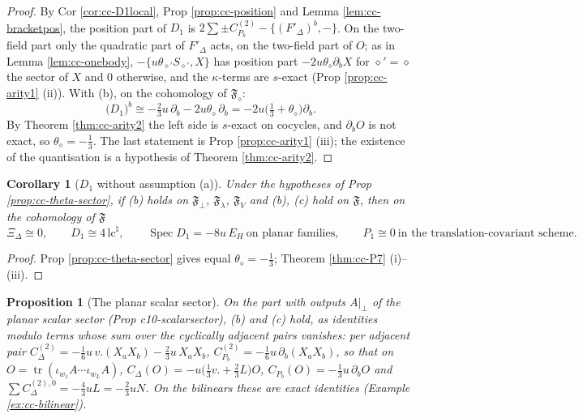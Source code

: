 \documentclass[11pt]{article}
\numberwithin{equation}{section}
\theoremstyle{plain}
\newtheorem{proposition}[theorem]{Proposition}
\newtheorem{corollary}[theorem]{Corollary}
\theoremstyle{definition}
\newcommand{\Ap}{A|_{\perp}}
\begin{document}
\begin{proof}
By Cor \ref{cor:cc-D1local}, Prop \ref{prop:cc-position} and Lemma \ref{lem:cc-bracketpos}, the position part of $D_1$ is $2\sum\pm C^{(2)}_{P_b}-\{(F'_\Delta)^b,-\}$. On the two-field part only the quadratic part of $F'_\Delta$ acts, on the two-field part of $O$; as in Lemma \ref{lem:cc-onebody}, $-\{u\theta_{\diamond'}S_{\diamond'},X\}$ has position part $-2u\theta_\diamond\partial_bX$ for $\diamond'=\diamond$ the sector of $X$ and $0$ otherwise, and the $\kappa$-terms are $s$-exact (Prop \ref{prop:cc-arity1} (ii)). With (b), on the cohomology of $\mathfrak F_\diamond$:
\[
\big(D_1\big)^b\cong-\tfrac23u\,\partial_b-2u\theta_\diamond\,\partial_b=-2u\big(\tfrac13+\theta_\diamond\big)\partial_b .
\]
By Theorem \ref{thm:cc-arity2} the left side is $s$-exact on cocycles, and $\partial_bO$ is not exact, so $\theta_\diamond=-\tfrac13$. The last statement is Prop \ref{prop:cc-arity1} (iii); the existence of the quantisation is a hypothesis of Theorem \ref{thm:cc-arity2}.
\end{proof}

\begin{corollary}[$D_1$ without assumption (a)]
\label{cor:cc-noA}
Under the hypotheses of Prop \ref{prop:cc-theta-sector}, if (b) holds on $\mathfrak F_\perp$, $\mathfrak F_\lambda$, $\mathfrak F_V$ and (b), (c) hold on $\mathfrak F$, then on the cohomology of $\mathfrak F$
\[
\Xi_\Delta\cong0,\qquad D_1\cong4\,\mathrm{lc}^\natural,\qquad \operatorname{Spec}D_1=-8u\,E_H\ \text{on planar families},\qquad P_1\cong0\ \text{in the translation-covariant scheme}.
\]
\end{corollary}

\begin{proof}
Prop \ref{prop:cc-theta-sector} gives equal $\theta_\diamond=-\tfrac13$; Theorem \ref{thm:cc-P7} (i)--(iii).
\end{proof}

\begin{proposition}[The planar scalar sector]
\label{prop:cc-scalar}
On the part with outputs $\Ap$ of the planar scalar sector (Prop c10-scalarsector), (b) and (c) hold, as identities modulo terms whose sum over the cyclically adjacent pairs vanishes: per adjacent pair $C^{(2)}_\Delta=-\tfrac16u\,v.(X_aX_b)-\tfrac23u\,X_aX_b$, $C^{(2)}_{P_b}=-\tfrac16u\,\partial_b(X_aX_b)$, so that on $O=\operatorname{tr}(\iota_{w_1}A\cdots\iota_{w_L}A)$, $C_\Delta(O)=-u\big(\tfrac13v.+\tfrac23L\big)O$, $C_{P_b}(O)=-\tfrac13u\,\partial_bO$ and $\sum C^{(2),0}_\Delta=-\tfrac43uL=-\tfrac23uN$. On the bilinears these are exact identities (Example \ref{ex:cc-bilinear}).
\end{proposition}
\end{document}
